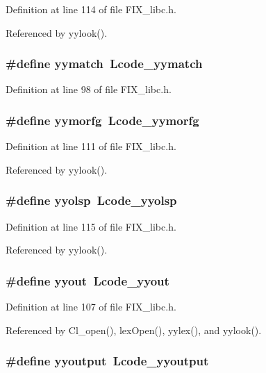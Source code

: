 Definition at line 114 of file FIX\_\-libc.h.

Referenced by yylook().
\subsubsection{\setlength{\rightskip}{0pt plus 5cm}\#define \bf{yymatch}~Lcode\_\-yymatch}\label{FIX__libc_8h_5073c32108314a93d228bf482ce4ec87}




Definition at line 98 of file FIX\_\-libc.h.
\subsubsection{\setlength{\rightskip}{0pt plus 5cm}\#define \bf{yymorfg}~Lcode\_\-yymorfg}\label{FIX__libc_8h_9cb077d9d445c80872b386d88fe8a1ea}




Definition at line 111 of file FIX\_\-libc.h.

Referenced by yylook().
\subsubsection{\setlength{\rightskip}{0pt plus 5cm}\#define \bf{yyolsp}~Lcode\_\-yyolsp}\label{FIX__libc_8h_0e690e32452c62a1a1cd8e846a1485aa}




Definition at line 115 of file FIX\_\-libc.h.

Referenced by yylook().
\subsubsection{\setlength{\rightskip}{0pt plus 5cm}\#define \bf{yyout}~Lcode\_\-yyout}\label{FIX__libc_8h_4fd44867d448dcb6fc32ea004a15de54}




Definition at line 107 of file FIX\_\-libc.h.

Referenced by Cl\_\-open(), lex\-Open(), yylex(), and yylook().
\subsubsection{\setlength{\rightskip}{0pt plus 5cm}\#define yyoutput~Lcode\_\-yyoutput}\label{FIX__libc_8h_c689806b750d25a2a7a8a8750c35677a}




